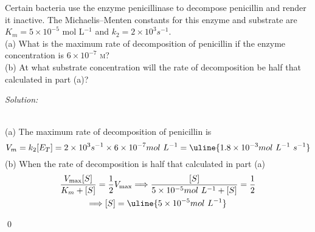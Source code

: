 \documentclass[12pt]{article}
\newenvironment{problem}[2][Problem]{\begin{trivlist}
\item[\hskip \labelsep {\bfseries #1}\hskip \labelsep {\bfseries #2.}]}{\end{trivlist}}
\newenvironment{sol}
    {\emph{Solution:}
    }
    {
    \qed
    }
\begin{document}
\begin{problem}{18.47}
Certain bacteria use the enzyme penicillinase to decompose penicillin and render it inactive. The Michaelis–Menten constants for this enzyme and substrate are $K_m=5\times10^{-5}$ mol L$^{-1}$ and $k_2=2\times10^3s^{-1}$.\\
(a) What is the maximum rate of decomposition of penicillin if the enzyme concentration is $6\times10^{-7}$ \textsc{m}?\\
(b) At what substrate concentration will the rate of decomposition be half that calculated in part (a)?
\end{problem}
\begin{sol}
\\(a) The maximum rate of decomposition of penicillin is
\[
V_m=k_2[E_T]=2\times10^3s^{-1}\times6\times10^{-7}mol~L^{-1}=\uline{1.8\times10^{-3}mol~L^{-1}~s^{-1}}
\]
(b) When the rate of decomposition is half that calculated in part (a)
\begin{gather*}
\frac{V_{\max}[S]}{K_m+[S]}=\frac{1}{2}V_{\max}\Longrightarrow\frac{[S]}{5\times10^{-5}mol~L^{-1}+[S]}=\frac{1}{2}\\
\Longrightarrow[S]=\uline{5\times10^{-5}mol~L^{-1}}
\end{gather*}
\end{sol}
\end{document}
